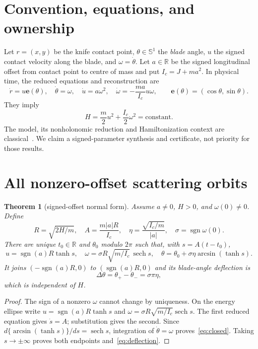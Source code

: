 \documentclass[9pt]{extarticle}
\newtheorem{theorem}{Theorem}
\newcommand{\ee}{\mathbf e}
\newcommand{\sgn}{\operatorname{sgn}}
\begin{document}
\section{Convention, equations, and ownership}
Let $r=(x,y)$ be the knife contact point, $\theta\in\mathbb S^1$ the
\emph{blade} angle, $u$ the signed contact velocity along the blade, and
$\omega=\dot\theta$.  Let $a\in\mathbb R$ be the signed longitudinal offset
from contact point to centre of mass and put $I_c=J+ma^2$.  In physical time,
the reduced equations and reconstruction are
\begin{equation}\label{eq:system}
 \dot r=u\ee(\theta),\quad \dot\theta=\omega,\quad
 \dot u=a\omega^2,\quad
 \dot\omega=-\frac{ma}{I_c}u\omega,\qquad
 \ee(\theta)=(\cos\theta,\sin\theta).
\end{equation}
They imply
\begin{equation}\label{eq:energy}
 H=\frac m2u^2+\frac{I_c}{2}\omega^2=\text{constant}.
\end{equation}
The model, its nonholonomic reduction and Hamiltonization context are
classical~\cite{Bloch00,BM09,M87}.  We claim a signed-parameter synthesis and
certificate, not priority for those results.

\section{All nonzero-offset scattering orbits}
\begin{theorem}[signed-offset normal form]\label{thm:normal}
Assume $a\ne0$, $H>0$, and $\omega(0)\ne0$.  Define
\[
 R=\sqrt{2H/m},\quad A=\frac{m|a|R}{I_c},\quad
 \eta=\frac{\sqrt{I_c/m}}{|a|},\quad \sigma=\sgn\omega(0).
\]
There are unique $t_0\in\mathbb R$ and $\theta_0$ modulo $2\pi$ such that,
with $s=A(t-t_0)$,
\begin{equation}\label{eq:closed}
 u=\sgn(a)R\tanh s,
 \quad\omega=\sigma R\sqrt{m/I_c}\,\operatorname{sech}s,
 \quad\theta=\theta_0+\sigma\eta\arcsin(\tanh s).
\end{equation}
It joins $(-\sgn(a)R,0)$ to $(\sgn(a)R,0)$ and its blade-angle deflection is
\begin{equation}\label{eq:deflection}
 \Delta\theta=\theta_+-\theta_-=\sigma\pi\eta,
\end{equation}
which is independent of $H$.
\end{theorem}
\begin{proof}
The sign of a nonzero $\omega$ cannot change by uniqueness.  On the energy
ellipse write $u=\sgn(a)R\tanh s$ and
$\omega=\sigma R\sqrt{m/I_c}\operatorname{sech}s$.  The first reduced
equation gives $\dot s=A$; substitution gives the second.  Since
$d\{\arcsin(\tanh s)\}/ds=\operatorname{sech}s$, integration of
$\dot\theta=\omega$ proves~\eqref{eq:closed}.  Taking $s\to\pm\infty$
proves both endpoints and~\eqref{eq:deflection}.
\end{proof}
\end{document}

